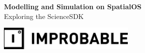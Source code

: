 \documentclass[11pt,fleqn]{book} %
\begin{document}
\setlength{\parskip}{2ex}

\begingroup
\thispagestyle{empty}
\centering
\vspace*{5cm}
\par\normalfont\fontsize{35}{35}\sffamily\selectfont
\textbf{Modelling and Simulation on SpatialOS}\\
{\LARGE Exploring the ScienceSDK}\par %
\vspace*{1cm}
\includegraphics[width=0.5\textwidth]{media/Improbable_full-black.eps}
\par %
\endgroup
\end{document}
